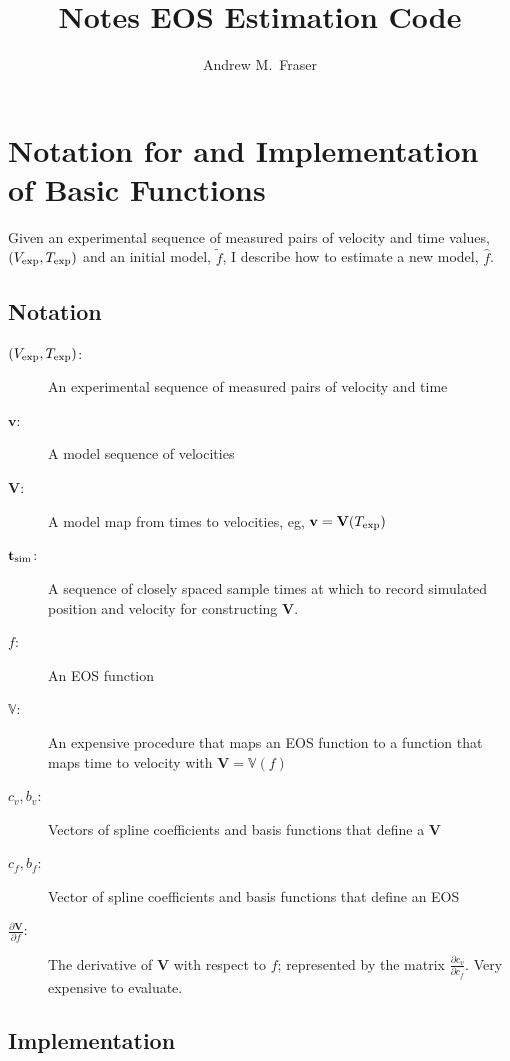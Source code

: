 \documentclass[]{article}
\title{Notes EOS Estimation Code}
\author{Andrew M.\ Fraser}
\newcommand{\fnom}{\tilde f}
\newcommand{\fhat}{\hat f}
\newcommand{\partiald}[2]{\frac{\partial #1}{\partial #2}}
\newcommand\bv{\mathbf{v}}
\newcommand\Vfunc{\mathbb{V}}
\newcommand\Vt{\mathbf{V}}
\newcommand\vexp{V_{\rm{exp}}}
\newcommand\texp{T_{\rm{exp}}}
\newcommand\cf{c_f}
\newcommand\cv{c_v}
\newcommand\fbasis{b_f}
\newcommand\vbasis{b_v}
\newcommand\tsim{{\mathbf t}_{\rm{sim}}}
\newcommand\DVDf{\partiald{\Vt}{f}}
\begin{document}
\maketitle

\section{Notation for and Implementation of Basic Functions}
\label{sec:basic}


Given an experimental sequence of measured pairs of velocity and time
values, $(\vexp, \texp)$ and an initial model, $\fnom$, I describe how
to estimate a new model, $\fhat$.

\subsection{Notation}
\label{sec:basic_notation}

\begin{description}
\item[$(\vexp, \texp)$:] An experimental sequence of measured pairs of
  velocity and time
\item[$\bv$:] A model sequence of velocities
\item[$\Vt$:] A model map from  times to velocities, eg, $\bv = \Vt(\texp)$
\item[$\tsim$:] A sequence of closely spaced sample times at which to record
  simulated position and velocity for constructing $\Vt$.
\item[$f$:] An EOS function
\item[$\Vfunc$:] An expensive procedure that maps an EOS function to a
  function that maps time to velocity with $\Vt = \Vfunc(f)$
\item[$\cv,\vbasis$:] Vectors of spline coefficients and basis functions
  that define a $\Vt$
\item[$\cf,\fbasis$:] Vector of spline coefficients and basis functions
  that define an EOS
\item[$\DVDf$:] The derivative of $\Vt$ with respect to $f$;
  represented by the matrix $\partiald{\cv}{\cf}$.  Very expensive to
  evaluate.
\end{description}

\subsection{Implementation}
\label{sec:basic_implementation}
\end{document}
